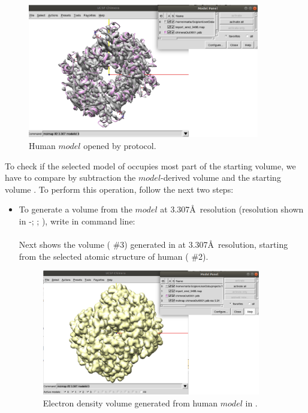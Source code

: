 \begin{itemize}
 \begin{figure}[H]
    \centering 
    \captionsetup{width=.7\linewidth} 
    \includegraphics[width=0.90\textwidth]{Images/Fig42}
    \caption{Human  $model$ opened by \chimera {} protocol.}
    \label{fig:chimera_operate_vol}
   \end{figure}
 
 To check if the selected model of  occupies most part of the starting volume, we have to compare by subtraction the $model$-derived volume and the starting volume . To perform this operation, follow the next two steps:\\
 
  \begin{itemize}
  
  \item To generate a volume from the $model$ at 3.307\AA\ resolution (resolution shown in \phenix-; ; ), write in \chimera command line:\\
  
  \\
  
  Next  shows the volume ( \#3) generated in \chimera at 3.307\AA\ resolution, starting from the selected atomic structure of human  ( \#2). 
   
  \begin{figure}[H]
    \centering 
    \captionsetup{width=.7\linewidth} 
    \includegraphics[width=0.90\textwidth]{Images/Fig43}
    \caption{Electron density volume generated from human  $model$ in \chimera.}
    \label{fig:chimera_operate_vol_2}
   \end{figure}
  

\end{itemize}
\end{itemize}

